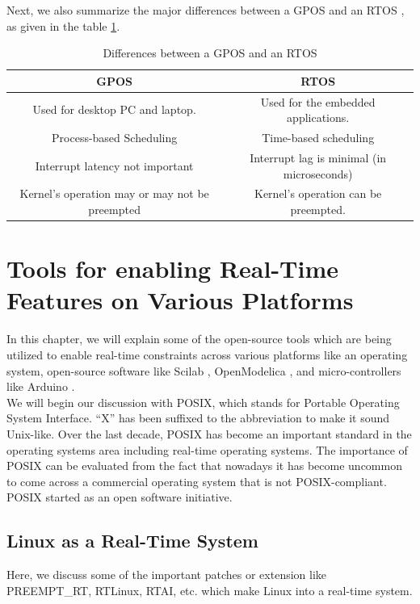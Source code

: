 \documentclass[12pt]{report}
\begin{document}
Next, we also summarize the major differences between a GPOS and an RTOS \cite{rtos-guru}, as given in the table \ref{tab:gpos-rtos}. 
\begin{table}[h]
    \centering
    \begin{tabular}{|c|c|}
        \hline
        \textbf{GPOS} & \textbf{RTOS} \\
        \hline \hline
        Used for desktop PC and laptop. & Used for the embedded applications. \\
        \hline
        Process-based Scheduling &	Time-based scheduling \\
        \hline 
        Interrupt latency not important & Interrupt lag is minimal (in microseconds)\\
        \hline
        Kernel's operation may or may not be preempted &Kernel's operation can be preempted.\\
        \hline
    \end{tabular}
    \caption{Differences between a GPOS and an RTOS}
    \label{tab:gpos-rtos}
\end{table}

\chapter{Tools for enabling Real-Time Features on Various Platforms}
In this chapter, we will explain some of the open-source tools which are being utilized to enable real-time constraints across various platforms like an operating system, open-source software like Scilab \cite{scilab}, OpenModelica \cite{OM},  and micro-controllers like Arduino \cite{arduino}. \\

We will begin our discussion with POSIX, which stands for Portable Operating System Interface. “X” has been suffixed to the  abbreviation to make it sound Unix-like. Over the last decade, POSIX has become an important standard in the operating systems area including real-time operating systems. The importance of  POSIX can be evaluated from the fact that nowadays it has become uncommon to come across a commercial operating system that is not POSIX-compliant. POSIX started as an open software initiative.

\section{Linux as a Real-Time System}
Here, we discuss some of the important patches or extension like PREEMPT\_RT, RTLinux, RTAI, etc. which make Linux into a real-time system. 
\end{document}
